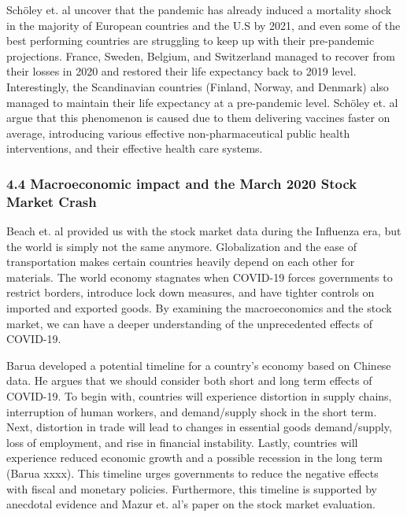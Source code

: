 \documentclass[
]{article}
\begin{document}
Schöley et. al uncover that the pandemic has already induced a mortality
shock in the majority of European countries and the U.S by 2021, and
even some of the best performing countries are struggling to keep up
with their pre-pandemic projections. France, Sweden, Belgium, and
Switzerland managed to recover from their losses in 2020 and restored
their life expectancy back to 2019 level. Interestingly, the
Scandinavian countries (Finland, Norway, and Denmark) also managed to
maintain their life expectancy at a pre-pandemic level. Schöley et. al
argue that this phenomenon is caused due to them delivering vaccines
faster on average, introducing various effective non-pharmaceutical
public health interventions, and their effective health care systems.

\hypertarget{macroeconomic-impact-and-the-march-2020-stock-market-crash}{%
\subsubsection{4.4 Macroeconomic impact and the March 2020 Stock Market
Crash}\label{macroeconomic-impact-and-the-march-2020-stock-market-crash}}

Beach et. al provided us with the stock market data during the Influenza
era, but the world is simply not the same anymore. Globalization and the
ease of transportation makes certain countries heavily depend on each
other for materials. The world economy stagnates when COVID-19 forces
governments to restrict borders, introduce lock down measures, and have
tighter controls on imported and exported goods. By examining the
macroeconomics and the stock market, we can have a deeper understanding
of the unprecedented effects of COVID-19.

Barua developed a potential timeline for a country's economy based on
Chinese data. He argues that we should consider both short and long term
effects of COVID-19. To begin with, countries will experience distortion
in supply chains, interruption of human workers, and demand/supply shock
in the short term. Next, distortion in trade will lead to changes in
essential goods demand/supply, loss of employment, and rise in financial
instability. Lastly, countries will experience reduced economic growth
and a possible recession in the long term (Barua xxxx). This timeline
urges governments to reduce the negative effects with fiscal and
monetary policies. Furthermore, this timeline is supported by anecdotal
evidence and Mazur et. al's paper on the stock market evaluation.
\end{document}
